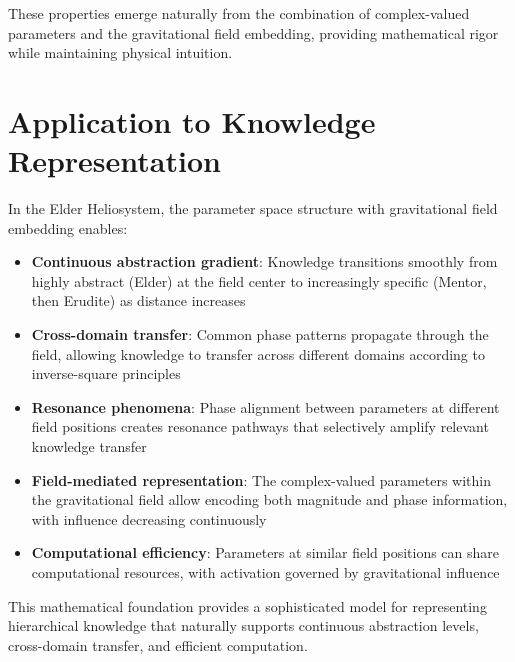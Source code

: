 These properties emerge naturally from the combination of complex-valued parameters and the gravitational field embedding, providing mathematical rigor while maintaining physical intuition.

\section{Application to Knowledge Representation}

In the Elder Heliosystem, the parameter space structure with gravitational field embedding enables:

\begin{itemize}
    \item \textbf{Continuous abstraction gradient}: Knowledge transitions smoothly from highly abstract (Elder) at the field center to increasingly specific (Mentor, then Erudite) as distance increases
    
    \item \textbf{Cross-domain transfer}: Common phase patterns propagate through the field, allowing knowledge to transfer across different domains according to inverse-square principles
    
    \item \textbf{Resonance phenomena}: Phase alignment between parameters at different field positions creates resonance pathways that selectively amplify relevant knowledge transfer
    
    \item \textbf{Field-mediated representation}: The complex-valued parameters within the gravitational field allow encoding both magnitude and phase information, with influence decreasing continuously
    
    \item \textbf{Computational efficiency}: Parameters at similar field positions can share computational resources, with activation governed by gravitational influence
\end{itemize}

This mathematical foundation provides a sophisticated model for representing hierarchical knowledge that naturally supports continuous abstraction levels, cross-domain transfer, and efficient computation.